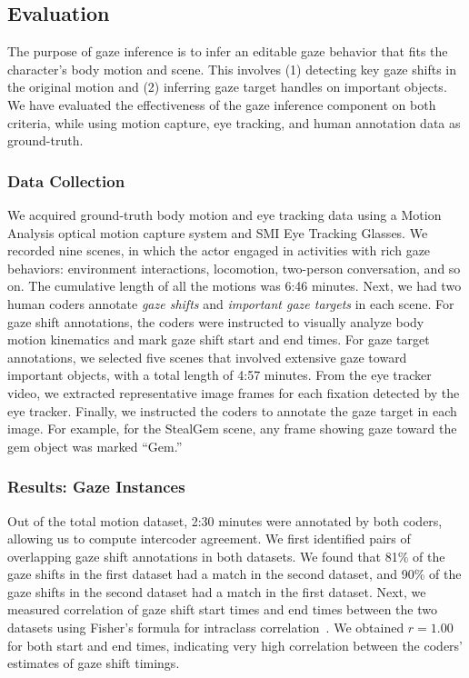 \subsection{Evaluation}
\label{sec:GazeInferenceEvaluation}

The purpose of gaze inference is to infer an editable gaze behavior that fits the character's body motion and scene. This involves (1) detecting key gaze shifts in the original motion and (2) inferring gaze target handles on important objects. We have evaluated the effectiveness of the gaze inference component on both criteria, while using motion capture, eye tracking, and human annotation data as ground-truth.

\subsubsection{Data Collection}

We acquired ground-truth body motion and eye tracking data using a Motion Analysis optical motion capture system and SMI Eye Tracking Glasses. We recorded nine scenes, in which the actor engaged in activities with rich gaze behaviors: environment interactions, locomotion, two-person conversation, and so on. The cumulative length of all the motions was 6:46 minutes. Next, we had two human coders annotate \emph{gaze shifts} and \emph{important gaze targets} in each scene. For gaze shift annotations, the coders were instructed to visually analyze body motion kinematics and mark gaze shift start and end times. For gaze target annotations, we selected five scenes that involved extensive gaze toward important objects, with a total length of 4:57 minutes. From the eye tracker video, we extracted representative image frames for each fixation detected by the eye tracker. Finally, we instructed the coders to annotate the gaze target in each image. For example, for the StealGem scene, any frame showing gaze toward the gem object was marked ``Gem.''

\subsubsection{Results: Gaze Instances}

Out of the total motion dataset, 2:30 minutes were annotated by both coders, allowing us to compute intercoder agreement. We first identified pairs of overlapping gaze shift annotations in both datasets. We found that 81\% of the gaze shifts in the first dataset had a match in the second dataset, and 90\% of the gaze shifts in the second dataset had a match in the first dataset. Next, we measured correlation of gaze shift start times and end times between the two datasets using Fisher's formula for intraclass correlation~\cite{fisher1925statistical}. We obtained $r = 1.00$ for both start and end times, indicating very high correlation between the coders' estimates of gaze shift timings.

